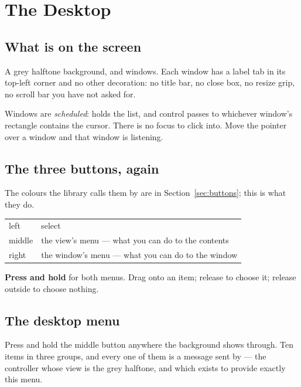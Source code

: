 \chapter{The Desktop}
\label{ch:desktop}


\section{What is on the screen}

A grey halftone background, and windows. Each window has a label tab in its
top-left corner and no other decoration: no title bar, no close box, no resize
grip, no scroll bar you have not asked for.

Windows are \emph{scheduled}:  holds the list, and
control passes to whichever window's rectangle contains the cursor. There is
no focus to click into. Move the pointer over a window and that window is
listening.

\section{The three buttons, again}

The colours the library calls them by are in Section~\ref{sec:buttons}; this
is what they do.

\begin{center}
\small
\begin{tabular}{@{}lp{}@{}}
\toprule
left & select\\
middle & the view's menu --- what you can do to the contents\\
right & the window's menu --- what you can do to the window\\
\bottomrule
\end{tabular}
\end{center}

\textbf{Press and hold} for both menus. Drag onto an item; release to choose
it; release outside to choose nothing.

\section{The desktop menu}
\label{sec:desktopmenu}

Press and hold the middle button anywhere the background shows through. Ten
items in three groups, and every one of them is a message sent by
 --- the controller whose view is the grey halftone, and
which exists to provide exactly this menu.

